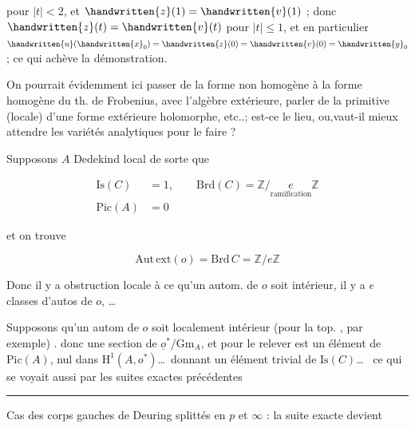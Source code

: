 pour $|t|<2$, et $\handwritten{z}(1)=\handwritten{v}(1)$ ; donc $\handwritten{z}(t)=\handwritten{v}(t)$ pour $|t|\leq 1$, et en particulier $\handwritten{u}(\handwritten{x}_0)=\handwritten{z}(0)=\handwritten{v}(0)=\handwritten{y}_0$ ; ce qui achève la démonstration.

On pourrait évidemment ici passer de la forme non homogène à la forme homogène du th. de Frobenius, avec l'algèbre extérieure, parler de la primitive (locale) d'une forme extérieure holomorphe, etc..; est-ce le lieu, ou,vaut-il mieux attendre les variétés analytiques pour le faire ?

Supposons $A$  Dedekind \deleted{\unsure{$\ne$}} local  de sorte que

\[
\begin{aligned}
\mathrm{Is}(C)&=1,\qquad \mathrm{Brd}(C)=\mathbb{Z}/\underset{\text{ramification}}{e}\mathbb{Z}\\
\mathrm{Pic}(A)&=0
\end{aligned}
\]

et on trouve

\[
\mathrm{Aut\,ext}(o)=\mathrm{Brd}\, C=\mathbb{Z}/e\mathbb{Z}
\]

Donc il y a obstruction locale à ce qu'un autom. de $o$ soit  intérieur, il y a $e$ classes d'autos de $o$, \ldots

Supposons  qu'un autom de $o$ soit localement intérieur (pour la top. , par exemple) .   donc une section de $\underline{o}^*/\mathrm{Gm}_A$, et   pour le relever est un élément de $\mathrm{Pic}(A)$, nul dans  $\mathrm{H}^1(A,o^*)$\ldots\ donnant un élément trivial de $\mathrm{Is}(C)$\ldots\  ce qui se voyait aussi par les suites exactes précédentes

\begin{center}\rule{0.22\linewidth}{0.3pt}\end{center}

Cas des corps gauches de Deuring splittés en $p$ et $\infty$ : la suite exacte devient



